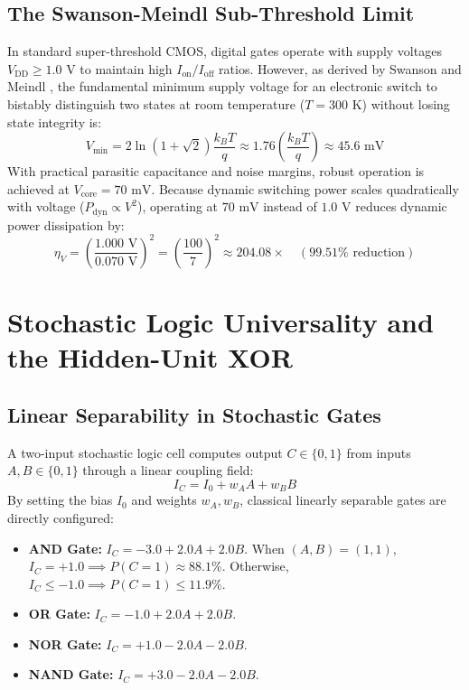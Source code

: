 \documentclass[journal,10pt,twocolumn]{IEEEtran}
\begin{document}
\subsection{The Swanson-Meindl Sub-Threshold Limit}
In standard super-threshold CMOS, digital gates operate with supply voltages $V_{\text{DD}} \ge 1.0\text{ V}$ to maintain high $I_{\text{on}}/I_{\text{off}}$ ratios. However, as derived by Swanson and Meindl \cite{swanson1972fundamental}, the fundamental minimum supply voltage for an electronic switch to bistably distinguish two states at room temperature ($T = 300\text{ K}$) without losing state integrity is:
\begin{equation}
V_{\text{min}} = 2 \ln(1 + \sqrt{2}) \frac{k_B T}{q} \approx 1.76 \left(\frac{k_B T}{q}\right) \approx 45.6\text{ mV}
\end{equation}
With practical parasitic capacitance and noise margins, robust operation is achieved at $V_{\text{core}} = 70\text{ mV}$. Because dynamic switching power scales quadratically with voltage ($P_{\text{dyn}} \propto V^2$), operating at $70\text{ mV}$ instead of $1.0\text{ V}$ reduces dynamic power dissipation by:
\begin{equation}
\eta_V = \left(\frac{1.000\text{ V}}{0.070\text{ V}}\right)^2 = \left(\frac{100}{7}\right)^2 \approx 204.08\times \quad (99.51\% \text{ reduction})
\end{equation}

\section{Stochastic Logic Universality and the Hidden-Unit XOR}

\subsection{Linear Separability in Stochastic Gates}
A two-input stochastic logic cell computes output $C \in \{0, 1\}$ from inputs $A, B \in \{0, 1\}$ through a linear coupling field:
\begin{equation}
I_C = I_0 + w_A A + w_B B
\label{eq:linear_field}
\end{equation}
By setting the bias $I_0$ and weights $w_A, w_B$, classical linearly separable gates are directly configured:
\begin{itemize}
    \item \textbf{AND Gate:} $I_C = -3.0 + 2.0A + 2.0B$. When $(A,B) = (1,1)$, $I_C = +1.0 \implies P(C=1) \approx 88.1\%$. Otherwise, $I_C \le -1.0 \implies P(C=1) \le 11.9\%$.
    \item \textbf{OR Gate:} $I_C = -1.0 + 2.0A + 2.0B$.
    \item \textbf{NOR Gate:} $I_C = +1.0 - 2.0A - 2.0B$.
    \item \textbf{NAND Gate:} $I_C = +3.0 - 2.0A - 2.0B$.
\end{itemize}
\end{document}
